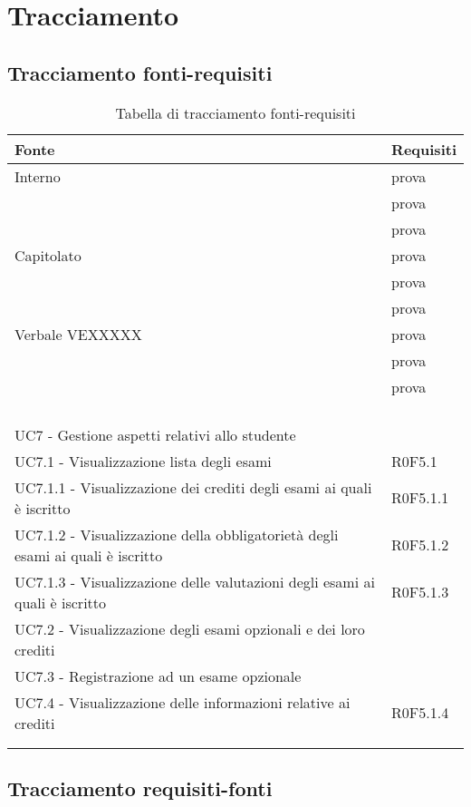 \documentclass[AnalisiDeiRequisiti.tex]{subfiles}
\begin{document}
\section{Tracciamento}
\subsection{Tracciamento fonti-requisiti}

\label{table:Tabella di tracciamento fonti-requisiti}
\begin{longtable}[H]{|p{8cm}|p{5cm}|}
	\hline
	\rowcolor[HTML]{38FFF8} 
	\textbf{Fonte} & \textbf{Requisiti} \\ \hline
	\endhead
	Interno & prova \\
	& prova \\
	& prova \\ \hline
	Capitolato & prova \\
	& prova \\
	& prova \\ \hline
	Verbale VEXXXXX & prova \\
	& prova \\
	& prova \\ \hline
	&  \\ \hline
	&  \\ \hline
	&  \\ \hline
	&  \\ \hline
	UC7 - Gestione aspetti relativi allo studente &  \\ \hline
	UC7.1 - Visualizzazione lista degli esami & R0F5.1 \\ \hline
	UC7.1.1 - Visualizzazione dei crediti degli esami ai quali è iscritto & R0F5.1.1 \\ \hline
	UC7.1.2 - Visualizzazione della obbligatorietà degli esami ai quali è iscritto & R0F5.1.2 \\ \hline
	UC7.1.3 - Visualizzazione delle valutazioni degli esami ai quali è iscritto	& R0F5.1.3 \\ \hline
	UC7.2 - Visualizzazione degli esami opzionali e dei loro crediti &  \\ \hline
	UC7.3 - Registrazione ad un esame opzionale &  \\ \hline
	UC7.4 - Visualizzazione delle informazioni relative ai crediti & R0F5.1.4 \\ \hline
	&  \\ \hline
	\caption{Tabella di tracciamento fonti-requisiti}
\end{longtable}

\subsection{Tracciamento requisiti-fonti}
\end{document}
